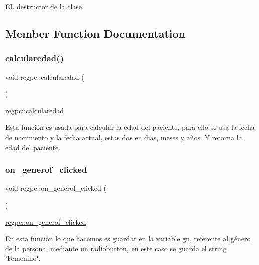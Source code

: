 EL destructor de la clase. 

\subsection{Member Function Documentation}
\mbox{\label{classregpc_a4c2805dbeac86a39d8afd591c7f14ec9}} 
\subsubsection{\texorpdfstring{calcularedad()}{calcularedad()}}
{\footnotesize\ttfamily void regpc\+::calcularedad (\begin{DoxyParamCaption}{ }\end{DoxyParamCaption})}



\hyperlink{classregpc_a4c2805dbeac86a39d8afd591c7f14ec9}{regpc\+::calcularedad} 

Esta función es usada para calcular la edad del paciente, para ello se usa la fecha de nacimiento y la fecha actual, estas dos en dias, meses y años. Y retorna la edad del paciente. \mbox{\label{classregpc_aebdc318917c7ea9b3a2aca0e8155f854}} 
\subsubsection{\texorpdfstring{on\+\_\+generof\+\_\+clicked}{on\_generof\_clicked}}
{\footnotesize\ttfamily void regpc\+::on\+\_\+generof\+\_\+clicked (\begin{DoxyParamCaption}{ }\end{DoxyParamCaption})\hspace{0.3cm}{\ttfamily [slot]}}



\hyperlink{classregpc_aebdc318917c7ea9b3a2aca0e8155f854}{regpc\+::on\+\_\+generof\+\_\+clicked} 

En esta función lo que hacemos es guardar en la variable gn, referente al género de la persona, mediante un radiobutton, en este caso se guarda el string \char`\"{}\+Femenino\char`\"{}. \mbox{\label{classregpc_a5e7c8c456ee0a0a51e341d00bd0d8ba3}} 
